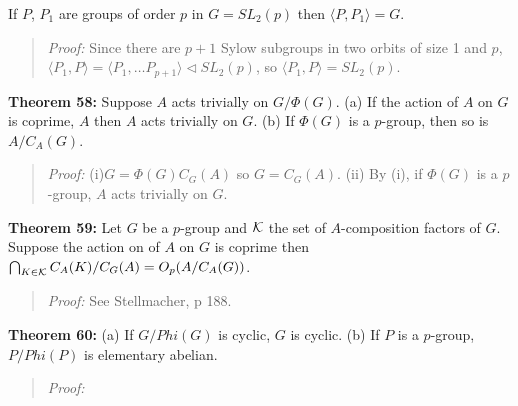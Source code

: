 If $P$, $P_1$ are groups of order $p$ in $G = SL_2(p)$ then $\langle P, P_1 \rangle = G$.
\begin{quote}
\emph{Proof:}
Since there are $p + 1$ Sylow subgroups in two orbits of size 1 and $p$, $\langle P_1, P \rangle =
\langle P_1, \ldots P_{p+1} \rangle \lhd SL_2(p)$, so $\langle P_1, P \rangle = SL_2(p)$.
\end{quote}
{\bf Theorem 58:}
Suppose $A$ acts trivially on $G/\Phi(G)$.  (a) If the action of $A$ on $G$ is coprime, $A$
then $A$ acts trivially on $G$. (b) If $\Phi(G)$ is a $p$-group, then so is $A/C_A(G)$.
\begin{quote}
\emph{Proof:} 
(i)$G= \Phi(G)C_G(A)$ so  $G= C_G(A)$.
(ii) By (i), if $\Phi(G)$ is a $p$-group, $A$ acts trivially on $G$.
\end{quote}
{\bf Theorem 59:}
Let $G$ be a $p$-group and ${\cal K}$ the set of $A$-composition factors of $G$.  Suppose the action on
of $A$ on $G$ is coprime then $\bigcap_{K \in {\cal K}} C_A(K)/C_G(A) = O_p(A/C_A(G))$.
\begin{quote}
\emph{Proof:}  See Stellmacher, p 188.
\end{quote}
{\bf Theorem 60:}  (a) If $G/Phi(G)$ is cyclic, $G$ is cyclic. (b) If $P$ is a $p$-group, $P/Phi(P)$ is elementary abelian.
\begin{quote}
\emph{Proof:} 
\end{quote}
